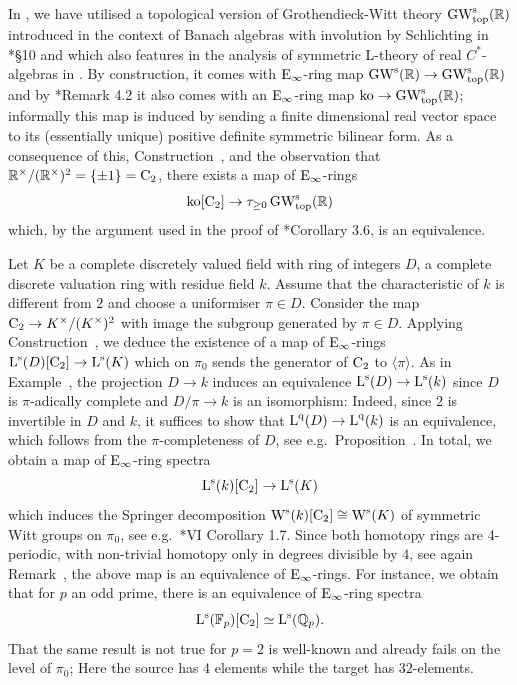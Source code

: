 \begin{example}
In \paperthree, we have utilised a topological version of Grothendieck-Witt theory $\operatorname{GW}_{\mathrm{top}} ^{\mathrm{s}}(\mathbb{R})$ introduced in the context of Banach algebras with involution by Schlichting in \cite{schlichting-derived}*{\S 10} and which also features in the analysis of symmetric L-theory of real $C^*$-algebras in \cite{LNS}. By construction, it comes with ${\mathrm{E}_{\infty}}$-ring map $\operatorname{GW}^{\mathrm{s}}(\mathbb{R}) \to \operatorname{GW}^{\mathrm{s}}_{\mathrm{top}}(\mathbb{R})$ and by \cite{LNS}*{Remark 4.2} it also comes with an ${\mathrm{E}_{\infty}}$-ring map $\mathrm{ko} \to \operatorname{GW}^{\mathrm{s}}_{\mathrm{top}}(\mathbb{R})$; informally this map is induced by sending a finite dimensional real vector space to its (essentially unique) positive definite symmetric bilinear form. As a consequence of this, Construction~, and the observation that $\mathbb{R}^\times/(\mathbb{R}^\times)^2 = \{\pm 1\} = \mathrm{C_2}$, there exists a map of ${\mathrm{E}_{\infty}}$-rings
\[
\mathrm{ko}[\mathrm{C_2}] \to \tau_{\geq0}\operatorname{GW}_{\mathrm{top}}^{\mathrm{s}}(\mathbb{R})
\]
which, by the argument used in the proof of \cite{LNS}*{Corollary 3.6}, is an equivalence.
\end{example}

\begin{example}
Let $K$ be a complete discretely valued field with ring of integers $D$, a complete discrete valuation ring with residue field $k$. Assume that the characteristic of $k$ is different from $2$ and choose a uniformiser $\pi \in D$. 
Consider the map $\mathrm{C_2} \to K^\times/(K^\times)^2$ with image the subgroup generated by $\pi \in D$. Applying Construction~, we deduce the existence of a map of ${\mathrm{E}_{\infty}}$-rings $\operatorname L^{\mathrm{s}}(D)[\mathrm{C_2}] \to \operatorname L^{\mathrm{s}}(K)$ which on $\pi_0$ sends the generator of $\mathrm{C_2}$ to $\langle \pi \rangle$.
As in Example~, the projection $D \to k$ induces an equivalence $\operatorname L^{\mathrm{s}}(D) \to \operatorname L^{\mathrm{s}}(k)$ since $D$ is $\pi$-adically complete and $D/\pi \to k$ is an isomorphism: Indeed, since $2$ is invertible in $D$ and $k$, it suffices to show that $\operatorname L^{\mathrm{q}}(D) \to \operatorname L^{\mathrm{q}}(k)$ is an equivalence, which follows from the $\pi$-completeness of $D$, see e.g.\ Proposition~. In total, we obtain a map of ${\mathrm{E}_{\infty}}$-ring spectra
\[
\operatorname L^{\mathrm{s}}(k)[\mathrm{C_2}] \to \operatorname L^{\mathrm{s}}(K)
\]
which induces the Springer decomposition $\operatorname W^{\mathrm{s}}(k)[\mathrm{C_2}] \cong \operatorname W^{\mathrm{s}}(K)$ of symmetric Witt groups on $\pi_0$, see e.g.\ \cite{Lam}*{VI Corollary 1.7}. Since both homotopy rings are 4-periodic, with non-trivial homotopy only in degrees divisible by $4$, see again Remark~, the above map is an equivalence of ${\mathrm{E}_{\infty}}$-rings.
For instance, we obtain that for $p$ an odd prime, there is an equivalence of ${\mathrm{E}_{\infty}}$-ring spectra 
\[
\operatorname L^{\mathrm{s}}(\mathbb{F}_p)[\mathrm{C_2}] \simeq \operatorname L^{\mathrm{s}}(\mathbb{Q}_p).
\]
That the same result is not true for $p=2$ is well-known and already fails on the level of $\pi_0$; Here the source has 4 elements while the target has $32$-elements.
\end{example}

